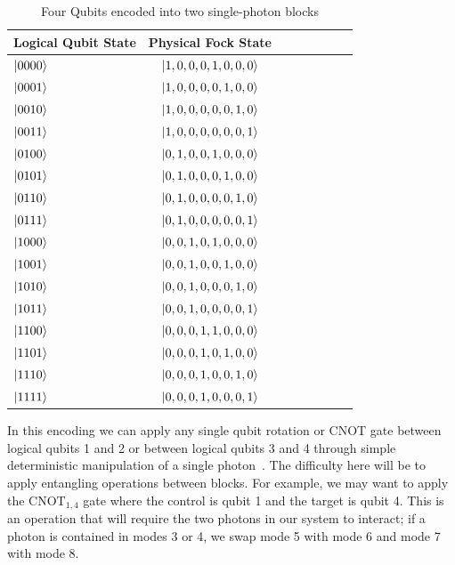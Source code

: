 \documentclass[aps,pra,twocolumn,showpacs,superscriptaddress,floatfix,10pt]{revtex4}
\begin{document}
\begin {table}[h]
\begin{center}
	\begin{tabular}{l*{6}{c}r} 
		Logical Qubit State      \quad \quad \quad     & Physical Fock State \\
		\hline 
		\quad \quad \quad $\ket{0000}$     & $\ket{1,0,0,0,1,0,0,0}$ \\
		\quad \quad \quad $\ket{0001}$            & $\ket{1,0,0,0,0,1,0,0}$ \\
		\quad \quad \quad $\ket{0010}$           & 
		$\ket{1,0,0,0,0,0,1,0}$ \\
		\quad \quad \quad $\ket{0011}$           & 
		$\ket{1,0,0,0,0,0,0,1}$ \\
		\quad \quad \quad $\ket{0100}$           & 
		$\ket{0,1,0,0,1,0,0,0}$ \\
		\quad \quad \quad $\ket{0101}$           & 
		$\ket{0,1,0,0,0,1,0,0}$ \\
		\quad \quad \quad $\ket{0110}$           & 
		$\ket{0,1,0,0,0,0,1,0}$ \\
		\quad \quad \quad $\ket{0111}$            & $\ket{0,1,0,0,0,0,0,1}$ \\
		\quad \quad \quad $\ket{1000}$            & $\ket{0,0,1,0,1,0,0,0}$ \\
		\quad \quad \quad $\ket{1001}$            & $\ket{0,0,1,0,0,1,0,0}$ \\
		\quad \quad \quad $\ket{1010}$            & $\ket{0,0,1,0,0,0,1,0}$ \\
		\quad \quad \quad $\ket{1011}$            & $\ket{0,0,1,0,0,0,0,1}$ \\
		\quad \quad \quad $\ket{1100}$            & $\ket{0,0,0,1,1,0,0,0}$ \\
		\quad \quad \quad $\ket{1101}$            & $\ket{0,0,0,1,0,1,0,0}$ \\
		\quad \quad \quad $\ket{1110}$            & $\ket{0,0,0,1,0,0,1,0}$ \\
		\quad \quad \quad $\ket{1111}$            & $\ket{0,0,0,1,0,0,0,1}$ \\
	\end{tabular}
	\caption{ \label{Block Encoding Table} Four Qubits encoded into two single-photon blocks}
\end{center}
\end{table}
In this encoding we can apply any single qubit rotation or CNOT gate between logical qubits 1 and 2 or between logical qubits 3 and 4 through simple deterministic manipulation of a single photon~\cite{Adami}. The difficulty here will be to apply entangling operations between blocks. For example, we may want to apply the $\mbox{CNOT}_{1,4}$ gate where the control is qubit 1 and the target is qubit 4. This is an operation that will require the two photons in our system to interact; if a photon is contained in modes 3 or 4, we swap mode 5 with mode 6 and mode 7 with mode 8. 
\end{document}
